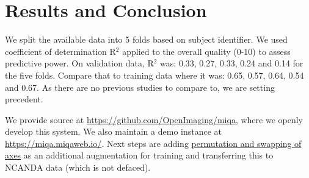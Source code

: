 \documentclass{midl} %
\begin{document}
\section{Results and Conclusion}

We split the available data into 5 folds based on subject identifier. We used coefficient of determination R$^2$ applied to the overall quality (0-10) to assess predictive power. On validation data, R$^2$ was: 0.33, 0.27, 0.33, 0.24 and 0.14 for the five folds. Compare that to training data where it was: 0.65, 0.57, 0.64, 0.54 and 0.67. As there are no previous studies to compare to, we are setting precedent.

We provide source at \url{https://github.com/OpenImaging/miqa}, where we openly develop this system. We also maintain a demo instance at \url{https://miqa.miqaweb.io/}. Next steps are adding \href{https://github.com/OpenImaging/miqa/pull/441}{permutation and swapping of axes} as an additional augmentation for training
and transferring this to NCANDA data (which is not defaced).




\end{document}
